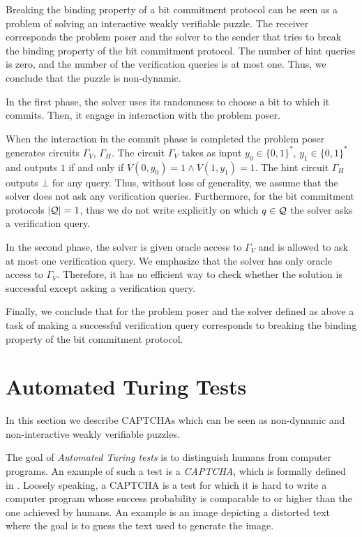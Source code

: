 Breaking the binding property of a bit commitment protocol can be seen as a problem of solving
an interactive weakly verifiable puzzle.
The receiver corresponds the problem poser and the solver to the sender that tries to break the binding property of the bit commitment protocol.
The number of hint queries is zero, and the number of the verification queries is at most one. Thus, we conclude that the puzzle is non-dynamic.

In the first phase, the solver uses its randomness to choose a bit to which it commits. Then, it engage in interaction with the problem poser.

When the interaction in the commit phase is completed the problem poser generates circuits $\Gamma_V$, $\Gamma_H$.
The circuit $\Gamma_V$ takes as input $y_0 \in \{0,1\}^{*}$, $y_1 \in \{0,1\}^{*}$ and outputs $1$
if and only if $V(0,y_0) = 1 \land V(1,y_1) = 1$. The hint circuit $\Gamma_H$ outputs $\bot$ for any query.
Thus, without loss of generality, we assume that the solver does not ask any verification queries.
Furthermore, for the bit commitment protocols $|\mathcal{Q}| = 1$, thus we do not write explicitly on which $q \in \mathcal{Q}$ the solver asks a verification query.

In the second phase, the solver is given oracle access to $\Gamma_V$ and is allowed to ask at most one verification query.
We emphasize that the solver has only oracle access to $\Gamma_V$. Therefore, it has no efficient way to check whether
the solution is successful except asking a verification query.

Finally, we conclude that for the problem poser and the solver defined as above a task of making a successful verification query
corresponds to breaking the binding property of the bit commitment protocol.

\section{Automated Turing Tests}
\label{section:att}
In this section we describe CAPTCHAs which can be seen as non-dynamic
and non-interactive weakly verifiable puzzles.

The goal of \textit{Automated Turing tests} is to distinguish humans from computer programs.
An example of such a test is a \textit{CAPTCHA}, which is formally defined in \cite{von2003captcha}.
Loosely speaking, a CAPTCHA is a test for which it is hard to write a computer program whose success
probability is comparable to or higher than the one achieved by humans. An example is an image
depicting a distorted text where the goal is to guess the text used to generate the image.

